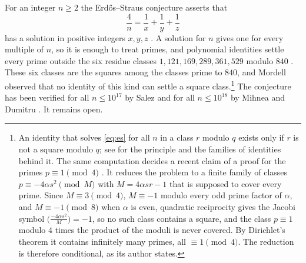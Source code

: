 \documentclass[aps,prd,twocolumn,superscriptaddress,nofootinbib,longbibliography,floatfix,showkeys,nobalancelastpage,amsmath,amssymb,10pt]{revtex4-2}
\theoremstyle{plain}
\theoremstyle{definition}
\theoremstyle{plain}
\begin{document}
For an integer $n\ge2$ the Erd\H{o}s--Straus conjecture asserts that
\begin{equation}\label{eq:es}
\frac4n=\frac1x+\frac1y+\frac1z
\end{equation}
has a solution in positive integers $x,y,z$ \cite[\S D11]{Guy}. A solution for $n$ gives one for every multiple of $n$, so it is enough to treat primes, and polynomial identities settle every prime outside the six residue classes $1,121,169,289,361,529$ modulo $840$ \cite{Mor}. These six classes are the squares among the classes prime to $840$, and Mordell observed that no identity of this kind can settle a square class.\footnote{An identity that solves \eqref{eq:es} for all $n$ in a class $r$ modulo $q$ exists only if $r$ is not a square modulo $q$; see \cite[Section~2]{ET} for the principle and the families of identities behind it. The same computation decides a recent claim of a proof for the primes $p\equiv1\pmod4$ \cite{Dya}. It reduces the problem to a finite family of classes $p\equiv-4\alpha s^2\pmod{M}$ with $M=4\alpha sr-1$ that is supposed to cover every prime. Since $M\equiv3\pmod4$, $M\equiv-1$ modulo every odd prime factor of $\alpha$, and $M\equiv-1\pmod8$ when $\alpha$ is even, quadratic reciprocity gives the Jacobi symbol $\bigl(\frac{-4\alpha s^2}{M}\bigr)=-1$, so no such class contains a square, and the class $p\equiv1$ modulo $4$ times the product of the moduli is never covered. By Dirichlet's theorem it contains infinitely many primes, all $\equiv1\pmod4$. The reduction is therefore conditional, as its author states.} The conjecture has been verified for all $n\le10^{17}$ by Salez \cite{Sal} and for all $n\le10^{18}$ by Mihnea and Dumitru \cite{MD}. It remains open.
\end{document}
